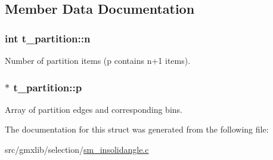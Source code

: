 \subsection{\-Member \-Data \-Documentation}
\hypertarget{structt__partition_a2458a54a00798d8c1afc16ecc6d0cf90}{
\subsubsection[{n}]{\setlength{\rightskip}{0pt plus 5cm}int {\bf t\-\_\-partition\-::n}}}\label{structt__partition_a2458a54a00798d8c1afc16ecc6d0cf90}
\-Number of partition items ({\ttfamily p} contains {\ttfamily n+1} items). \hypertarget{structt__partition_abb79c5907944546a76cf7ae9bd9033d4}{
\subsubsection[{p}]{$\ast$ {\bf t\-\_\-partition\-::p}}}\label{structt__partition_abb79c5907944546a76cf7ae9bd9033d4}
\-Array of partition edges and corresponding bins. 

\-The documentation for this struct was generated from the following file\-:\begin{DoxyCompactItemize}
\item 
src/gmxlib/selection/\hyperlink{sm__insolidangle_8c}{sm\-\_\-insolidangle.\-c}\end{DoxyCompactItemize}
